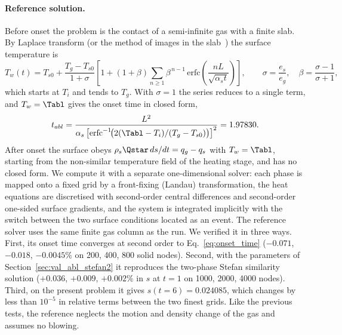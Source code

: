\paragraph{Reference solution.}
Before onset the problem is the contact of a semi-infinite gas with a finite slab. By Laplace transform (or the method of images in the slab~\cite{CarslawJaeger1959}) the surface temperature is
\begin{equation}
    T_w(t) = T_{s0} + \frac{T_g - T_{s0}}{1+\sigma}\left[1 + (1+\beta)\sum_{n\ge1}\beta^{\,n-1}\,\mathrm{erfc}\!\left(\frac{nL}{\sqrt{\alpha_s t}}\right)\right],
    \qquad \sigma = \frac{e_s}{e_g},\quad \beta = \frac{\sigma - 1}{\sigma + 1},
    \label{eq:onset_Tw}
\end{equation}
which starts at $T_i$ and tends to $T_g$. With $\sigma = 1$ the series reduces to a single term, and $T_w = \Tabl$ gives the onset time in closed form,
\begin{equation}
    t_{abl} = \frac{L^2}{\alpha_s\left[\mathrm{erfc}^{-1}\!\big(2(\Tabl - T_i)/(T_g - T_{s0})\big)\right]^2} = 1.97830 .
    \label{eq:onset_time}
\end{equation}
After onset the surface obeys $\rho_s\Qstar\,ds/dt = q_g - q_s$ with $T_w = \Tabl$, starting from the non-similar temperature field of the heating stage, and has no closed form. We compute it with a separate one-dimensional solver: each phase is mapped onto a fixed grid by a front-fixing (Landau) transformation, the heat equations are discretised with second-order central differences and second-order one-sided surface gradients, and the system is integrated implicitly with the switch between the two surface conditions located as an event. The reference solver uses the same finite gas column as the run. We verified it in three ways. First, its onset time converges at second order to Eq.~\ref{eq:onset_time} ($-0.071$, $-0.018$, $-0.0045\%$ on 200, 400, 800 solid nodes). Second, with the parameters of Section~\ref{sec:val_abl_stefan2} it reproduces the two-phase Stefan similarity solution ($+0.036$, $+0.009$, $+0.002\%$ in $s$ at $t = 1$ on 1000, 2000, 4000 nodes). Third, on the present problem it gives $s(t = 6) = 0.024085$, which changes by less than $10^{-5}$ in relative terms between the two finest grids. Like the previous tests, the reference neglects the motion and density change of the gas and assumes no blowing.

